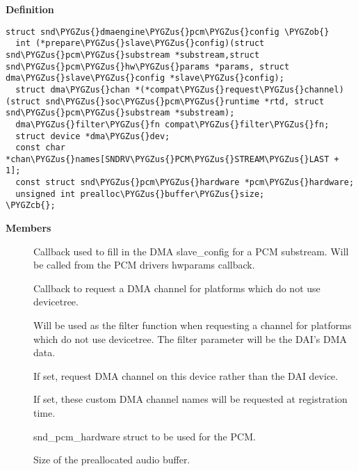 \documentclass[a4paper,8pt,english]{sphinxmanual}
\def\PYGZus{\char`\_}
\def\PYGZob{\char`\{}
\def\PYGZcb{\char`\}}
\begin{document}
\textbf{Definition}

\begin{Verbatim}[commandchars=\\\{\}]
struct snd\PYGZus{}dmaengine\PYGZus{}pcm\PYGZus{}config \PYGZob{}
  int (*prepare\PYGZus{}slave\PYGZus{}config)(struct snd\PYGZus{}pcm\PYGZus{}substream *substream,struct snd\PYGZus{}pcm\PYGZus{}hw\PYGZus{}params *params, struct dma\PYGZus{}slave\PYGZus{}config *slave\PYGZus{}config);
  struct dma\PYGZus{}chan *(*compat\PYGZus{}request\PYGZus{}channel)(struct snd\PYGZus{}soc\PYGZus{}pcm\PYGZus{}runtime *rtd, struct snd\PYGZus{}pcm\PYGZus{}substream *substream);
  dma\PYGZus{}filter\PYGZus{}fn compat\PYGZus{}filter\PYGZus{}fn;
  struct device *dma\PYGZus{}dev;
  const char *chan\PYGZus{}names[SNDRV\PYGZus{}PCM\PYGZus{}STREAM\PYGZus{}LAST + 1];
  const struct snd\PYGZus{}pcm\PYGZus{}hardware *pcm\PYGZus{}hardware;
  unsigned int prealloc\PYGZus{}buffer\PYGZus{}size;
\PYGZcb{};
\end{Verbatim}

\textbf{Members}
\begin{description}
\item[{}] \leavevmode
Callback used to fill in the DMA slave\_config for a
PCM substream. Will be called from the PCM drivers hwparams callback.

\item[{}] \leavevmode
Callback to request a DMA channel for platforms
which do not use devicetree.

\item[{}] \leavevmode
Will be used as the filter function when requesting a
channel for platforms which do not use devicetree. The filter parameter
will be the DAI's DMA data.

\item[{}] \leavevmode
If set, request DMA channel on this device rather than the DAI
device.

\item[{}] \leavevmode
If set, these custom DMA channel names will be requested at
registration time.

\item[{}] \leavevmode
snd\_pcm\_hardware struct to be used for the PCM.

\item[{}] \leavevmode
Size of the preallocated audio buffer.

\end{description}
\end{document}
